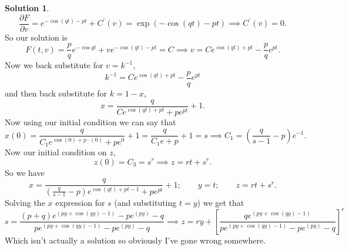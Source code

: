\documentclass[10pt]{article}
\theoremstyle{definition}
\newtheorem{soln}{Solution}
\newcommand{\primed}[1]{#1^\prime}
\begin{document}
\begin{soln}
  $$
    \frac{\partial F}{\partial v} = e^{-\cos (qt)-pt}+\primed{C}(v)=\exp\left(-\cos(qt)-pt\right)\implies \primed{C}(v)=0.
  $$
  So our solution is 
  $$
  F(t,v)=\frac{p}{q}e^{-\cos qt}+ve^{-\cos (qt)-pt}=C\implies v=Ce^{\cos(qt)+pt}-\frac{p}{q}e^{pt}.
  $$
  Now we back substitute for $v=k^{-1}$,
  $$k^{-1}=Ce^{\cos(qt)+pt}-\frac{p}{q}e^{pt}$$
  and then back substitute for $k=1-x$,
  $$x = \frac{q}{Ce^{\cos(qt)+pt}+pe^{pt}}+1.$$
  Now using our initial condition we can say that
  $$x(0)=\frac{q}{C_1e^{\cos(0)+p\cdot(0)}+pe^{0}}+1=\frac{q}{C_1e+p}+1=s\implies C_1 = \left(\frac{q}{s-1}-p\right)e^{-1}.$$
  Now our initial condition on $z$,
  $$z(0)=C_3=s^r\implies z=rt+s^r.$$
  So we have
  $$x=\frac{q}{ \left(\frac{q}{s-1}-p\right)e^{\cos(qt)+pt-1}+pe^{pt}}+1;\qquad y=t;\qquad z=rt+s^r.$$
  Solving the $x$ expression for $s$ (and substituting $t=y$) we get that 
  $$s = \frac{{\left(p + q\right)} e^{\left(p y + \cos\left(q y\right) - 1\right)} - p e^{\left(p y\right)} - q}{p e^{\left(p y + \cos\left(q y\right) - 1\right)} - p e^{\left(p y\right)} - q}
  \implies z = ry+\left[\frac{q e^{\left(p y + \cos\left(q y\right) - 1\right)}}{p e^{\left(p y + \cos\left(q y\right) - 1\right)} - p e^{\left(p y\right)} - q}\right]^r
  $$
  Which isn't actually a solution so obviously I've gone wrong somewhere. 
\end{soln}
\end{document}
